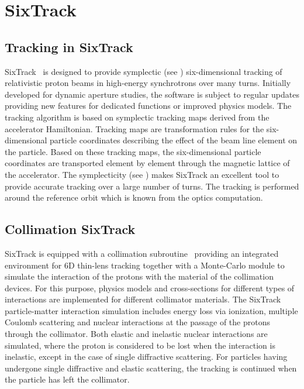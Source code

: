 \section{SixTrack}

\subsection{Tracking in SixTrack}

SixTrack~\cite{SixTrackref01,SixTrackref03,SixTrackref02,SixTrackref04} is designed to provide symplectic (see ) six-dimensional tracking of relativistic proton beams in high-energy synchrotrons over many turns. Initially developed for dynamic aperture studies, the software is subject to regular updates providing new features for dedicated functions or improved physics models. The tracking algorithm is based on symplectic tracking maps derived from the accelerator Hamiltonian. Tracking maps are transformation rules for the six-dimensional particle coordinates describing the effect of the beam line element on the particle. Based on these tracking maps, the six-dimensional particle coordinates are transported element by element through the magnetic lattice of the accelerator. The symplecticity (see ) makes SixTrack an excellent tool to provide accurate tracking over a large number of turns. The tracking is performed around the reference orbit which is known from the optics computation. 



\subsection{Collimation SixTrack}



SixTrack is equipped with a collimation subroutine~\cite{1591725,collsixtrack} providing an integrated environment for 6D thin-lens tracking together with a Monte-Carlo module to simulate the interaction of the protons with the material of the collimation devices. For this purpose, physics models and cross-sections for different types of interactions are implemented for different collimator materials. The SixTrack particle-matter interaction simulation includes energy loss via ionization, multiple Coulomb scattering and nuclear interactions at the passage of the protons through the collimator. Both elastic and inelastic nuclear interactions are simulated, where the proton is considered to be lost when the interaction is inelastic, except in the case of single diffractive scattering. For particles having undergone single diffractive and elastic scattering, the tracking is continued when the particle has left the collimator.


